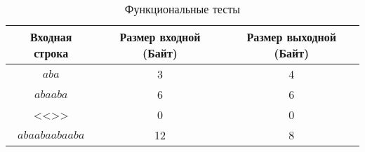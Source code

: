 \begin{table}[ht!]
	\begin{center}
		\captionsetup{justification=raggedright,singlelinecheck=off}
		\caption{\label{tbl:functional_test} Функциональные тесты}
		\begin{tabular}{|c|c|c|}
			\hline
			Входная строка & Размер входной (Байт) & Размер выходной (Байт) \\ 
			\hline
			$aba$          & 3  & 4 \\
			$abaaba$       & 6  & 6 \\
			<<>>           & 0  & 0 \\
            $abaabaabaaba$ & 12 & 8 \\
			\hline
		\end{tabular}
	\end{center}
\end{table}
